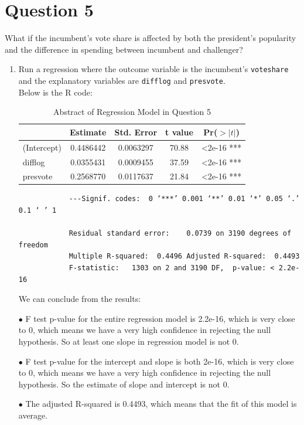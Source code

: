 \documentclass[12pt,letterpaper]{article}
\begin{document}
	\newpage	

\section*{Question 5}
\noindent What if the incumbent's vote share is affected by both the president's popularity and the difference in spending between incumbent and challenger? 
	\begin{enumerate}
		\item Run a regression where the outcome variable is the incumbent's \texttt{voteshare} and the explanatory variables are \texttt{difflog} and \texttt{presvote}.	\\
		
		Below is the R code:
		
		
		\begin{table}[ht]
			\centering
			\caption{Abstract of Regression Model in Question 5}
			\begin{tabular}{lcccc}
				\toprule
				& Estimate & Std. Error & t value & Pr($>|t|$) \\
				\midrule
				(Intercept) & 0.4486442 &0.0063297 & 70.88 &  <2e-16 *** \\
				difflog & 0.0355431 & 0.0009455& 37.59 & <2e-16 *** \\
				presvote & 0.2568770 & 0.0117637 & 21.84 & <2e-16 *** \\
				\bottomrule
			\end{tabular} 
		\end{table}
		\begin{verbatim}
			---Signif. codes:  0 ‘***’ 0.001 ‘**’ 0.01 ‘*’ 0.05 ‘.’ 0.1 ‘ ’ 1
			
			Residual standard error: 	0.0739 on 3190 degrees of freedom
			Multiple R-squared:  0.4496	Adjusted R-squared:  0.4493 
			F-statistic:   1303 on 2 and 3190 DF,  p-value: < 2.2e-16
		\end{verbatim}
		We can conclude from the results:
		\item[$\bullet$] F test p-value for the entire regression model is 2.2e-16, which is very close to 0, which means we have a very high confidence in rejecting the null hypothesis. So at least one slope in regression model is not 0.
		\item[$\bullet$] F test p-value for the intercept and slope is both 2e-16, which is very close to 0,  which means we have a very high confidence in rejecting the null hypothesis. So the estimate of slope and intercept is not 0.
		\item[$\bullet$] The adjusted R-squared is 0.4493, which means that the fit of this model is average.
		

\end{enumerate}
\end{document}
